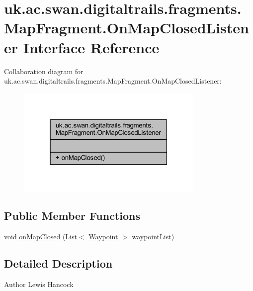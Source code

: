 \hypertarget{interfaceuk_1_1ac_1_1swan_1_1digitaltrails_1_1fragments_1_1_map_fragment_1_1_on_map_closed_listener}{\section{uk.\+ac.\+swan.\+digitaltrails.\+fragments.\+Map\+Fragment.\+On\+Map\+Closed\+Listener Interface Reference}
\label{interfaceuk_1_1ac_1_1swan_1_1digitaltrails_1_1fragments_1_1_map_fragment_1_1_on_map_closed_listener}
}


Collaboration diagram for uk.\+ac.\+swan.\+digitaltrails.\+fragments.\+Map\+Fragment.\+On\+Map\+Closed\+Listener\+:
\nopagebreak
\begin{figure}[H]
\begin{center}
\leavevmode
\includegraphics[width=256pt]{interfaceuk_1_1ac_1_1swan_1_1digitaltrails_1_1fragments_1_1_map_fragment_1_1_on_map_closed_listener__coll__graph}
\end{center}
\end{figure}
\subsection*{Public Member Functions}
\begin{DoxyCompactItemize}
\item 
void \hyperlink{interfaceuk_1_1ac_1_1swan_1_1digitaltrails_1_1fragments_1_1_map_fragment_1_1_on_map_closed_listener_a4b2827a25346b184795b308b3e682fd2}{on\+Map\+Closed} (List$<$ \hyperlink{classuk_1_1ac_1_1swan_1_1digitaltrails_1_1components_1_1_waypoint}{Waypoint} $>$ waypoint\+List)
\end{DoxyCompactItemize}


\subsection{Detailed Description}
\begin{DoxyAuthor}{Author}
Lewis Hancock 
\end{DoxyAuthor}


